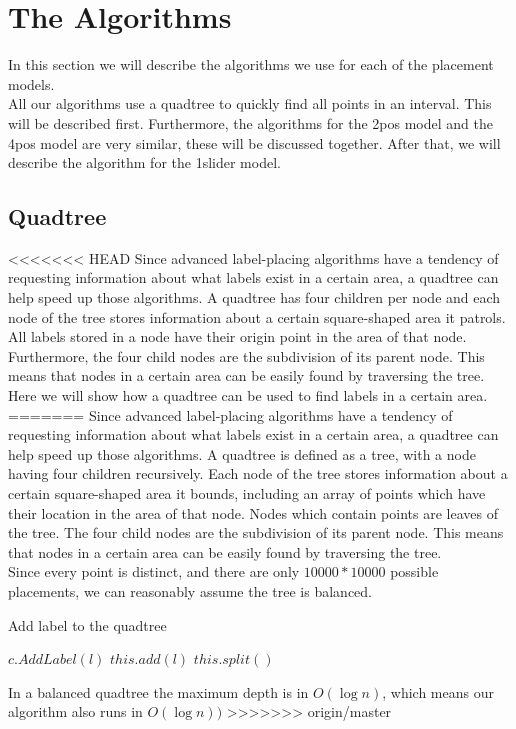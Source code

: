 \documentclass[crop=false,a4paper,oneside,11pt]{article}
\begin{document}
\section{The Algorithms}
In this section we will describe the algorithms we use for each of the placement models.\\
All our algorithms use a quadtree to quickly find all points in an interval. This will be described first. Furthermore, the algorithms for the 2pos model and the 4pos model are very similar, these will be discussed together. After that, we will describe the algorithm for the 1slider model.

\subsection{Quadtree}
<<<<<<< HEAD
Since advanced label-placing algorithms have a tendency of requesting information about what labels exist in a certain area, a quadtree can help speed up those algorithms. A quadtree has four children per node and each node of the tree stores information about a certain square-shaped area it patrols. All labels stored in a node have their origin point in the area of that node. Furthermore, the four child nodes are the subdivision of its parent node. This means that nodes in a certain area can be easily found by traversing the tree.\\

Here we will show how a quadtree can be used to find labels in a certain area.
=======
Since advanced label-placing algorithms have a tendency of requesting information about what labels exist in a certain area, a quadtree can help speed up those algorithms. A quadtree is defined as a tree, with a node having four children recursively. Each node of the tree stores information about a certain square-shaped area it bounds, including an array of points which have their location in the area of that node. Nodes which contain points are leaves of the tree. The four child nodes are the subdivision of its parent node. This means that nodes in a certain area can be easily found by traversing the tree.\\
Since every point is distinct, and there are only $10000 * 10000$ possible placements, we can reasonably assume the tree is balanced.\\
\begin{algorithm}[H]
\caption{Add label to the quadtree}
\begin{algorithmic}[1]
\State $c.AddLabel(l)$
\EndIf
\EndFor
\Else{}
\State $this.add(l)$
\State $this.split()$ 
\EndIf
\EndIf
\EndProcedure
\end{algorithmic}
\end{algorithm}
In a balanced quadtree the maximum depth is in $O(\log{n})$, which means our algorithm also runs in $O(\log{n}))$
>>>>>>> origin/master
\end{document}
